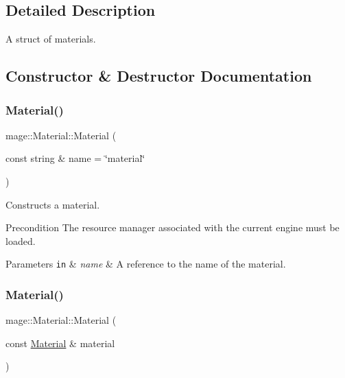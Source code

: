 \subsection{Detailed Description}
A struct of materials. 

\subsection{Constructor \& Destructor Documentation}
\hypertarget{structmage_1_1_material_aedc095c81f55be41533dbdf69d36df84}{}\label{structmage_1_1_material_aedc095c81f55be41533dbdf69d36df84} 
\subsubsection{\texorpdfstring{Material()}{Material()}\hspace{0.1cm}{\footnotesize\ttfamily [1/3]}}
{\footnotesize\ttfamily mage\+::\+Material\+::\+Material (\begin{DoxyParamCaption}\item[{const string \&}]{name = {\ttfamily \char`\"{}material\char`\"{}} }\end{DoxyParamCaption})\hspace{0.3cm}{\ttfamily [explicit]}}

Constructs a material.

\begin{DoxyPrecond}{Precondition}
The resource manager associated with the current engine must be loaded. 
\end{DoxyPrecond}

\begin{DoxyParams}[1]{Parameters}
\mbox{\tt in}  & {\em name} & A reference to the name of the material. \\
\hline
\end{DoxyParams}
\hypertarget{structmage_1_1_material_abed630412cdc4a6281389d128ec4b5f3}{}\label{structmage_1_1_material_abed630412cdc4a6281389d128ec4b5f3} 
\subsubsection{\texorpdfstring{Material()}{Material()}\hspace{0.1cm}{\footnotesize\ttfamily [2/3]}}
{\footnotesize\ttfamily mage\+::\+Material\+::\+Material (\begin{DoxyParamCaption}\item[{const \hyperlink{structmage_1_1_material}{Material} \&}]{material }\end{DoxyParamCaption})\hspace{0.3cm}{\ttfamily [default]}}

